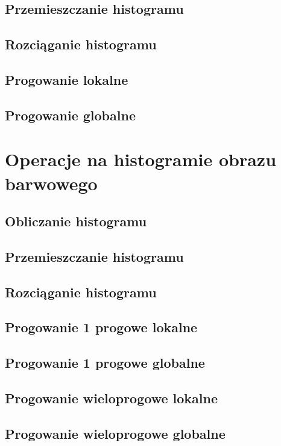 \documentclass[a4paper,12pt, titlepage]{report}
\begin{document}
\section{Przemieszczanie histogramu}
\section{Rozciąganie histogramu}
\section{Progowanie lokalne}
\section{Progowanie globalne}

\chapter{Operacje na histogramie obrazu barwowego}
\section{Obliczanie histogramu}
\section{Przemieszczanie histogramu}
\section{Rozciąganie histogramu}
\section{Progowanie 1 progowe lokalne}
\section{Progowanie 1 progowe globalne}
\section{Progowanie wieloprogowe lokalne}
\section{Progowanie wieloprogowe globalne}
\end{document}
